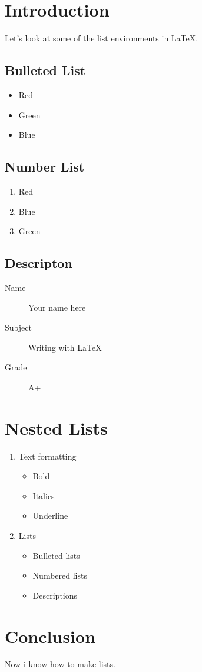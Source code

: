 \documentclass{article}
\title{}
\author{Tajib Smajlović}
\date{}
\begin{document}
	
	\maketitle
	
	\section{Introduction}
	Let's look at some of the list environments in \LaTeX.
	
	
	\subsection{Bulleted List}
	\begin{itemize}
		\item Red
		\item Green
		\item Blue
	\end{itemize}
	
	\subsection{Number List}
	\begin{enumerate}
		\item Red
		\item Blue
		\item Green
	\end{enumerate}
	
	\subsection{Descripton}
	\begin{description}
		\item [Name] Your name here
		\item [Subject] Writing with \LaTeX
		\item [Grade] A+
	\end{description}
	
	
	\section{Nested Lists}
	\begin{enumerate}
		\item Text formatting
		\begin{itemize}
			\item Bold
			\item Italics
			\item Underline
		\end{itemize}
		\item Lists
		\begin{itemize}
			\item Bulleted lists
			\item Numbered lists
			\item Descriptions
		\end{itemize}
	\end{enumerate}
	
	\section{Conclusion}
	Now i know how to make lists.
	
\end{document}
